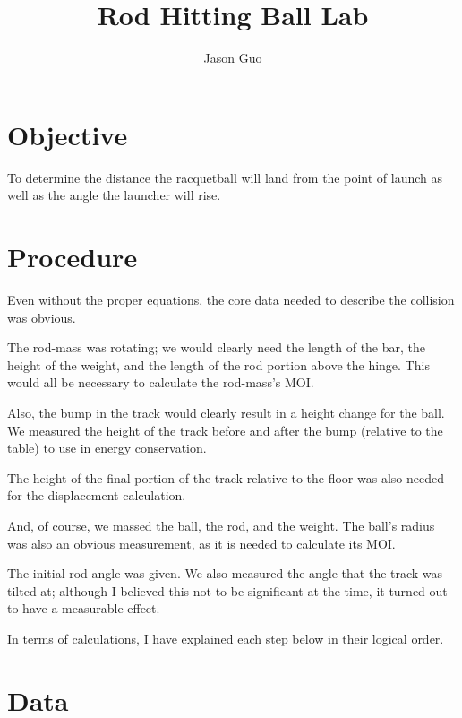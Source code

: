 \documentclass[12pt]{article} %
\title{Rod Hitting Ball Lab}
\author{Jason Guo}
\begin{document}
\maketitle

\section{Objective}

To determine the distance the racquetball will land from the point of launch as well as the angle the launcher will rise.

\section{Procedure}

Even without the proper equations, the core data needed to describe the collision was obvious.

The rod-mass was rotating; we would clearly need the length of the bar, the height of the weight, and the length of the rod portion above the hinge.
This would all be necessary to calculate the rod-mass's MOI.

Also, the bump in the track would clearly result in a height change for the ball. We measured the height of the track before and after the bump (relative to the table) to use in energy conservation.

The height of the final portion of the track relative to the floor was also needed for the displacement calculation.

And, of course, we massed the ball, the rod, and the weight. The ball's radius was also an obvious measurement, as it is needed to calculate its MOI.

The initial rod angle was given. We also measured the angle that the track was tilted at; although I believed this not to be significant at the time, it turned out to have a measurable effect.

In terms of calculations, I have explained each step below in their logical order.

\section{Data}
\end{document}
